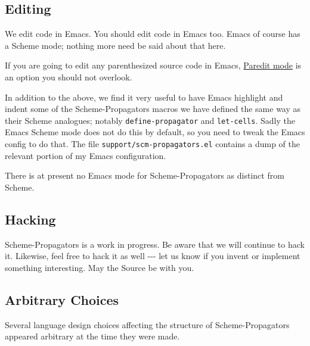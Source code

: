 \documentclass[12pt,letterpaper,english]{article}
\begin{document}

\subsection{Editing}
\label{editing}

We edit code in Emacs.  You should edit code in Emacs too.  Emacs of
course has a Scheme mode; nothing more need be said about that here.

If you are going to edit any parenthesized source code in Emacs,
\href{http://www.emacswiki.org/emacs/ParEdit}{Paredit mode} is an option you should not overlook.

In addition to the above, we find it very useful to have Emacs
highlight and indent some of the Scheme-Propagators macros we have
defined the same way as their Scheme analogues; notably
\texttt{define-propagator} and \texttt{let-cells}.  Sadly the
Emacs Scheme mode does not do this by default, so you need to tweak
the Emacs config to do that.  The file \texttt{support/scm-propagators.el}
contains a dump of the relevant portion of my Emacs configuration.

There is at present no Emacs mode for Scheme-Propagators as distinct
from Scheme.



\subsection{Hacking}
\label{hacking}

Scheme-Propagators is a work in progress.  Be aware that we will
continue to hack it.  Likewise, feel free to hack it as well -{}-{}- let
us know if you invent or implement something interesting.  May the
Source be with you.



\subsection{Arbitrary Choices}
\label{arbitrary-choices}

Several language design choices affecting the structure of
Scheme-Propagators appeared arbitrary at the time they were made.


\end{document}
